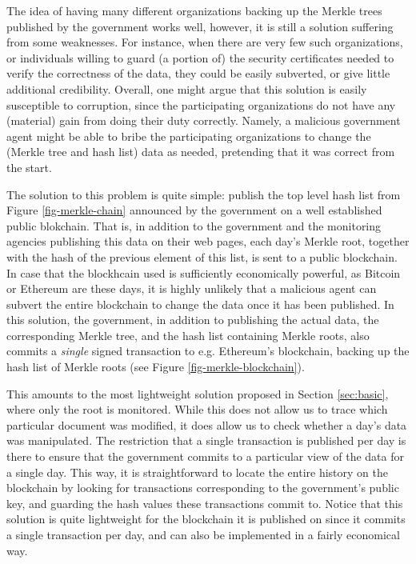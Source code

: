 

The idea of having many different organizations backing up the Merkle trees published by the government works well, however, it is still a solution suffering from some weaknesses. For instance, when there are very few such organizations, or individuals willing to guard (a portion of) the security certificates needed to verify the correctness of the data, they could be easily subverted, or give little additional credibility. Overall, one might argue that this solution is easily susceptible to corruption, since the participating organizations do not have any (material) gain from doing their duty correctly. Namely, a malicious government agent might be able to bribe the participating organizations to change the (Merkle tree and hash list) data as needed, pretending that it was correct from the start. %


The solution to this problem is quite simple: publish the top level hash list from Figure \ref{fig-merkle-chain} announced by the government on a well established public blokchain. That is, in addition to the government and the monitoring agencies publishing this data on their web pages, each day's Merkle root, together with the hash of the previous element of this list, is sent to a public blockchain. In case that the blockhcain used is sufficiently economically powerful, as Bitcoin or Ethereum are these days, it is highly unlikely that a malicious agent can subvert the entire blockchain to change the data once it has been published. In this solution, the government, in addition to publishing the actual data, the corresponding Merkle tree, and the hash list containing Merkle roots, also commits a {\em single} signed transaction to e.g. Ethereum's blockchain, backing up the hash list of Merkle roots (see Figure \ref{fig-merkle-blockchain}).

This amounts to the most lightweight solution proposed in Section \ref{sec:basic}, where only the root is monitored. While this does not allow us to trace which particular document was modified, it does allow us to check whether a day's data was manipulated. The restriction that a single transaction is published per day is there to ensure that  the government commits to a particular view of the data for a single day. This way, it is straightforward to locate the entire history on the blockchain by looking for transactions corresponding to the government's public key, and guarding the hash values these transactions commit to. Notice that this solution is quite lightweight for the blockchain it is published on since it commits a single transaction per day, and can also be implemented in a fairly economical way.



